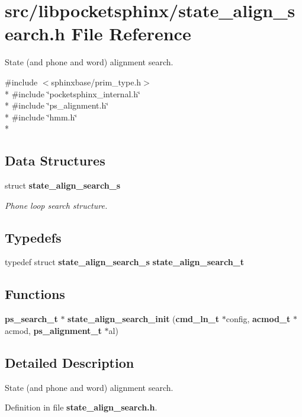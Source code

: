 \section{src/libpocketsphinx/state\-\_\-align\-\_\-search.h File Reference}
\label{state__align__search_8h}


State (and phone and word) alignment search.  


{\ttfamily \#include $<$sphinxbase/prim\-\_\-type.\-h$>$}\\*
{\ttfamily \#include \char`\"{}pocketsphinx\-\_\-internal.\-h\char`\"{}}\\*
{\ttfamily \#include \char`\"{}ps\-\_\-alignment.\-h\char`\"{}}\\*
{\ttfamily \#include \char`\"{}hmm.\-h\char`\"{}}\\*
\subsection*{Data Structures}
\begin{DoxyCompactItemize}
\item 
struct {\bf state\-\_\-align\-\_\-search\-\_\-s}
\begin{DoxyCompactList}\small\item\em Phone loop search structure. \end{DoxyCompactList}\end{DoxyCompactItemize}
\subsection*{Typedefs}
\begin{DoxyCompactItemize}
\item 
typedef struct {\bf state\-\_\-align\-\_\-search\-\_\-s} {\bfseries state\-\_\-align\-\_\-search\-\_\-t}\label{state__align__search_8h_a4559ae74ee038260ff66f432a7205aa8}

\end{DoxyCompactItemize}
\subsection*{Functions}
\begin{DoxyCompactItemize}
\item 
{\bf ps\-\_\-search\-\_\-t} $\ast$ {\bfseries state\-\_\-align\-\_\-search\-\_\-init} ({\bf cmd\-\_\-ln\-\_\-t} $\ast$config, {\bf acmod\-\_\-t} $\ast$acmod, {\bf ps\-\_\-alignment\-\_\-t} $\ast$al)\label{state__align__search_8h_a7263b71e3838f0689963439c8b695e15}

\end{DoxyCompactItemize}


\subsection{Detailed Description}
State (and phone and word) alignment search. 

Definition in file {\bf state\-\_\-align\-\_\-search.\-h}.

